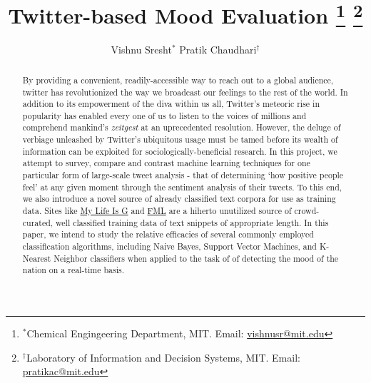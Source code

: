 \documentclass[10pt, letterpaper, conference, final, twocolumn]{ieeeconf}
\begin{document}
\title{\bf Twitter-based Mood Evaluation
	\thanks{$^*$Chemical Engingeering Department, MIT. Email: \href{mailto:vishnusr@mit.edu}{vishnusr@mit.edu}}
	\thanks{$^\dag$Laboratory of Information and Decision Systems, MIT. Email: \href{mailto:pratikac@mit.edu}{pratikac@mit.edu}}
}
\author{Vishnu Sresht$^*$ \qquad Pratik Chaudhari$^\dag$}
\maketitle

\begin{abstract}
By providing a convenient, readily-accessible way to reach out to a global audience, twitter has revolutionized the way we broadcast our feelings to the rest of the world. In addition to its empowerment of the diva within us all, Twitter's meteoric rise in popularity has enabled every one of us to listen to the voices of millions and comprehend mankind's \textit{zeitgest} at an uprecedented resolution. However, the deluge of verbiage unleashed by Twitter's ubiquitous usage must be tamed before its wealth of information can be exploited for sociologically-beneficial research. In this project, we attempt to survey, compare and contrast machine learning techniques for one particular form of large-scale tweet analysis - that of determining `how positive people feel' at any given moment through the sentiment analysis of their tweets. To this end, we also introduce a novel source of already classified text corpora for use as training data. Sites like \href{http://mylifeisg.com}{My Life Is G} and \href{http://fmylife.com}{FML} are a hiherto unutilized source of crowd-curated, well classified training data of text snippets of appropriate length. In this paper, we intend to study the relative efficacies of several commonly employed classification algorithms, including Naive Bayes, Support Vector Machines, and K-Nearest Neighbor classifiers when applied to the task of of detecting the mood of the nation on a real-time basis.

\end{abstract}



\end{document}
